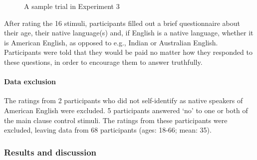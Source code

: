 \documentclass[11pt,fleqn]{article}
\newcommand{\6}{\mbox{$[\hspace*{-.6mm}[$}}
\newcommand{\9}{\mbox{$]\hspace*{-.6mm}]$}}
\begin{document}
\begin{figure}[H]
\centering


\caption{A sample trial in Experiment 3}\label{f-trial-exp2}
\end{figure}

After rating the 16 stimuli, participants filled out a brief questionnaire about their age, their native language(s) and, if English is a native language, whether it is
American English, as opposed to e.g., Indian or Australian English.
Participants were told that they would be paid no matter how they
responded to these questions, in order to encourage them to answer
truthfully.

\paragraph{Data exclusion} The ratings from 2 participants who did not self-identify as native speakers of American English were excluded. 5 participants answered `no' to one or both of the main clause control stimuli. The ratings from these participants were excluded, leaving data from 68 participants (ages: 18-66; mean: 35).

\subsubsection{Results and discussion}
\end{document}
